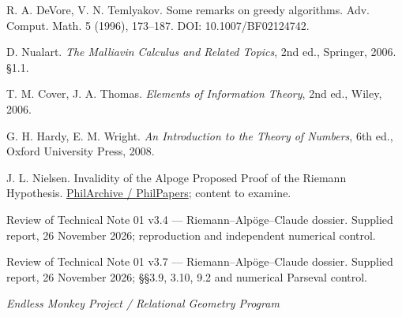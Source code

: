 \documentclass[11pt,a4paper]{article}
\begin{document}
\begin{enumerate}[label={[\arabic*]},leftmargin=2.2em,itemsep=2pt,font=\footnotesize]
\item R. A. DeVore, V. N. Temlyakov. Some remarks on greedy algorithms. Adv. Comput. Math. 5 (1996), 173--187. DOI: 10.1007/BF02124742.
\item D. Nualart. \emph{The Malliavin Calculus and Related Topics}, 2nd ed., Springer, 2006. §1.1.
\item T. M. Cover, J. A. Thomas. \emph{Elements of Information Theory}, 2nd ed., Wiley, 2006.
\item G. H. Hardy, E. M. Wright. \emph{An Introduction to the Theory of Numbers}, 6th ed., Oxford University Press, 2008.
\item J. L. Nielsen. Invalidity of the Alpoge Proposed Proof of the Riemann Hypothesis. \href{https://philpapers.org/rec/NIEIOT-2}{PhilArchive / PhilPapers}; content to examine.
\item Review of Technical Note 01 v3.4 --- Riemann--Alpöge--Claude dossier. Supplied report, 26 November 2026; reproduction and independent numerical control.
\item Review of Technical Note 01 v3.7 --- Riemann--Alpöge--Claude dossier. Supplied report, 26 November 2026; §§3.9, 3.10, 9.2 and numerical Parseval control.
\end{enumerate}
\vspace{1ex}\textit{Endless Monkey Project / Relational Geometry Program}
\end{document}
